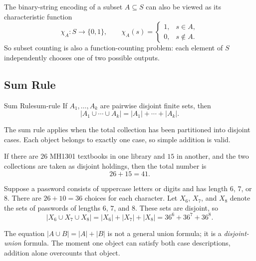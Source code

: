 \begin{extension}[title={Characteristic-function viewpoint}]
The binary-string encoding of a subset $A\subseteq S$ can also be viewed as its characteristic function
\[
\chi_A:S\to\{0,1\},
\qquad
\chi_A(s)=
\begin{cases}
1,& s\in A,\\
0,& s\notin A.
\end{cases}
\]
So subset counting is also a function-counting problem: each element of $S$ independently chooses one of two possible outputs.
\end{extension}

\subsection{Sum Rule}

\begin{theorem}{Sum Rule}{sum-rule}
If $A_1,\dots,A_k$ are pairwise disjoint finite sets, then
\[
|A_1\cup\cdots\cup A_k|=|A_1|+\cdots+|A_k|.
\]
\end{theorem}

The sum rule applies when the total collection has been partitioned into disjoint cases. Each object belongs to exactly one case, so simple addition is valid.

\begin{examplebox}[title={Textbooks}]
If there are $26$ MH1301 textbooks in one library and $15$ in another, and the two collections are taken as disjoint holdings, then the total number is
\[
26+15=41.
\]
\end{examplebox}

\begin{examplebox}[title={Passwords of lengths 6, 7, or 8}]
Suppose a password consists of uppercase letters or digits and has length $6$, $7$, or $8$. There are $26+10=36$ choices for each character. Let $X_6$, $X_7$, and $X_8$ denote the sets of passwords of lengths $6$, $7$, and $8$. These sets are disjoint, so
\[
|X_6\cup X_7\cup X_8|=|X_6|+|X_7|+|X_8|=36^6+36^7+36^8.
\]
\end{examplebox}

\begin{extension}[title={Why naive sum rule fails with overlap}]
The equation $|A\cup B|=|A|+|B|$ is not a general union formula; it is a \emph{disjoint-union} formula. The moment one object can satisfy both case descriptions, addition alone overcounts that object.
\end{extension}

